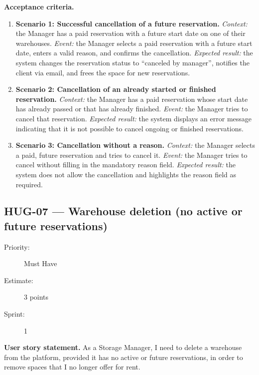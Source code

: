 \documentclass[11pt,a4paper,oneside]{report}
\begin{document}
\textbf{Acceptance criteria.}
\begin{enumerate}
\item \textbf{Scenario 1: Successful cancellation of a future reservation.} \emph{Context:} the Manager has a paid reservation with a future start date on one of their warehouses. \emph{Event:} the Manager selects a paid reservation with a future start date, enters a valid reason, and confirms the cancellation. \emph{Expected result:} the system changes the reservation status to ``canceled by manager'', notifies the client via email, and frees the space for new reservations.
\item \textbf{Scenario 2: Cancellation of an already started or finished reservation.} \emph{Context:} the Manager has a paid reservation whose start date has already passed or that has already finished. \emph{Event:} the Manager tries to cancel that reservation. \emph{Expected result:} the system displays an error message indicating that it is not possible to cancel ongoing or finished reservations.
\item \textbf{Scenario 3: Cancellation without a reason.} \emph{Context:} the Manager selects a paid, future reservation and tries to cancel it. \emph{Event:} the Manager tries to cancel without filling in the mandatory reason field. \emph{Expected result:} the system does not allow the cancellation and highlights the reason field as required.
\end{enumerate}

\subsection{HUG-07 --- Warehouse deletion (no active or future reservations)}
\label{req:HUG-07}
\begin{description}
\item[Priority:] Must Have \quad \item[Estimate:] 3 points \quad \item[Sprint:] 1
\end{description}

\textbf{User story statement.} As a Storage Manager, I need to delete a warehouse from the platform, provided it has no active or future reservations, in order to remove spaces that I no longer offer for rent.
\end{document}
